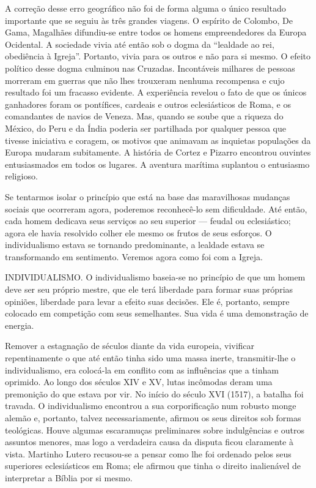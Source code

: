 \documentclass[11pt,a5paper,twoside,openany]{book}
\begin{document}
A correção desse erro geográfico não foi de forma alguma o único resultado importante que se seguiu às três grandes viagens. O espírito de Colombo, De Gama, Magalhães difundiu-se entre todos os homens empreendedores da Europa Ocidental. A sociedade vivia até então sob o dogma da “lealdade ao rei, obediência à Igreja”. Portanto, vivia para os outros e não para si mesmo. O efeito político desse dogma culminou nas Cruzadas. Incontáveis ​​milhares de pessoas morreram em guerras que não lhes trouxeram nenhuma recompensa e cujo resultado foi um fracasso evidente. A experiência revelou o fato de que os únicos ganhadores foram os pontífices, cardeais e outros eclesiásticos de Roma, e os comandantes de navios de Veneza. Mas, quando se soube que a riqueza do México, do Peru e da Índia poderia ser partilhada por qualquer pessoa que tivesse iniciativa e coragem, os motivos que animavam as inquietas populações da Europa mudaram subitamente. A história de Cortez e Pizarro encontrou ouvintes entusiasmados em todos os lugares. A aventura marítima suplantou o entusiasmo religioso.

Se tentarmos isolar o princípio que está na base das maravilhosas mudanças sociais que ocorreram agora, poderemos reconhecê-lo sem dificuldade. Até então, cada homem dedicava seus serviços ao seu superior — feudal ou eclesiástico; agora ele havia resolvido colher ele mesmo os frutos de seus esforços. O individualismo estava se tornando predominante, a lealdade estava se transformando em sentimento. Veremos agora como foi com a Igreja.

INDIVIDUALISMO. O individualismo baseia-se no princípio de que um homem deve ser seu próprio mestre, que ele terá liberdade para formar suas próprias opiniões, liberdade para levar a efeito suas decisões. Ele é, portanto, sempre colocado em competição com seus semelhantes. Sua vida é uma demonstração de energia.

Remover a estagnação de séculos diante da vida europeia, vivificar repentinamente o que até então tinha sido uma massa inerte, transmitir-lhe o individualismo, era colocá-la em conflito com as influências que a tinham oprimido. Ao longo dos séculos XIV e XV, lutas incômodas deram uma premonição do que estava por vir. No início do século XVI (1517), a batalha foi travada. O individualismo encontrou a sua corporificação num robusto monge alemão e, portanto, talvez necessariamente, afirmou os seus direitos sob formas teológicas. Houve algumas escaramuças preliminares sobre indulgências e outros assuntos menores, mas logo a verdadeira causa da disputa ficou claramente à vista. Martinho Lutero recusou-se a pensar como lhe foi ordenado pelos seus superiores eclesiásticos em Roma; ele afirmou que tinha o direito inalienável de interpretar a Bíblia por si mesmo.
\end{document}
